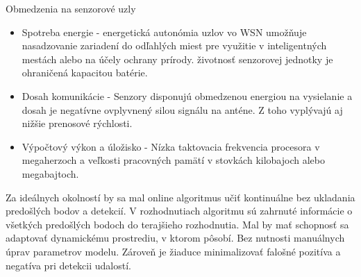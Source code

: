 Obmedzenia na senzorové uzly
\begin{itemize}
\item Spotreba energie - energetická autonómia uzlov vo WSN umožňuje nasadzovanie zariadení do odľahlých miest pre využitie v inteligentných mestách alebo na účely ochrany prírody. životnosť senzorovej jednotky je ohraničená kapacitou batérie.
\item Dosah komunikácie - Senzory disponujú obmedzenou energiou na vysielanie a dosah je negatívne ovplyvnený silou signálu na anténe. Z toho vyplývajú aj nižšie prenosové rýchlosti.
\item Výpočtový výkon a úložisko - Nízka taktovacia frekvencia procesora v megaherzoch a veľkosti pracovných pamätí v stovkách kilobajoch alebo megabajtoch.
\end{itemize}
\cite{big-data-collection-wsn}


Za ideálnych okolností by sa mal online algoritmus učiť kontinuálne bez ukladania predošlých bodov a detekcií.
V rozhodnutiach algoritmu sú zahrnuté informácie o všetkých predošlých bodoch do terajšieho rozhodnutia. Mal by mať schopnosť sa adaptovať dynamickému prostrediu, v ktorom pôsobí. Bez nutnosti manuálnych úprav parametrov modelu. Zároveň je žiaduce minimalizovať falošné pozitíva a negatíva pri detekcii udalostí.


\emptypage
